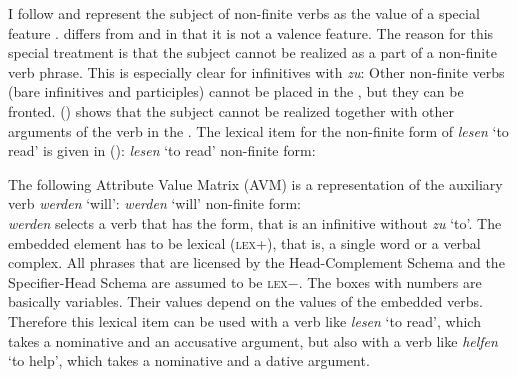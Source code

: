 \noindent
I follow
\citet[Section~3.1.1]{Kiss95a} and represent the subject of non-finite verbs as the value of a
special feature \subj. \subj differs from \spr and \comps in that it is not a valence feature. The
reason for this special treatment is that the subject cannot be realized as a part of a non-finite
verb phrase. This is especially clear for infinitives with \emph{zu}:
\eal
{}
\zl
Other non-finite verbs (bare infinitives and participles) cannot be placed in the \nf, but they
can be fronted. () shows that the subject cannot be realized together with other arguments
of the verb in the \vf.
\eal
{}
\zl
The lexical item for the non-finite form of \emph{lesen} `to read' is given in ():
\ea
\emph{lesen} `to read' non-finite form:\\
\z

\noindent
The following Attribute Value Matrix (AVM) is a representation of the auxiliary verb \emph{werden} `will':
\eas
\emph{werden} `will' non-finite form:\\
\zs
\emph{werden} selects a verb that has the  form, that is an infinitive without \emph{zu}
`to'. The embedded element has to be lexical (\textsc{lex}+), that is, a single word or a verbal
complex. All phrases that are licensed by the Head-Complement Schema and the Specifier-Head Schema
are assumed to be \textsc{lex}$-$.
The boxes with numbers are basically variables. Their values depend on the values of the
embedded verbs. Therefore this lexical item can be used with a verb like \emph{lesen} `to read',
which takes a nominative and an accusative argument, but also with a verb like \emph{helfen} `to help',
which takes a nominative and a dative argument.

